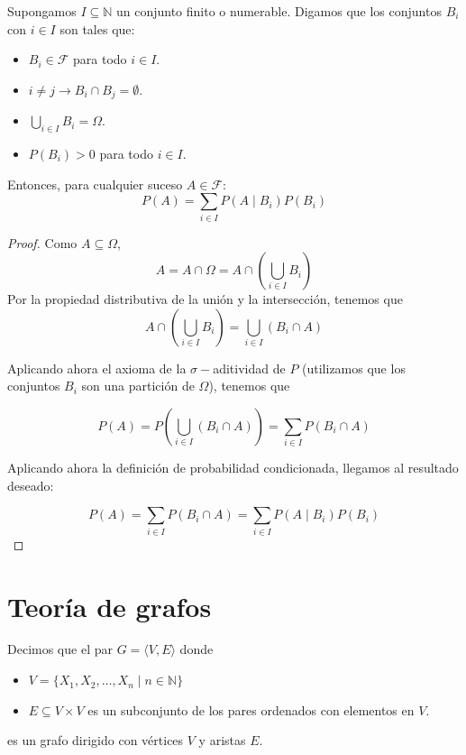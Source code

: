 \begin{teor}
Supongamos $I \subseteq \mathbb{N}$ un conjunto finito o numerable. Digamos que los conjuntos $B_i$ con $i \in I$ son tales que:
\begin{itemize}
    \item $B_i \in \mathcal{F}$ para todo $i \in I$.
    \item $i \neq j \rightarrow B_i \cap B_j = \emptyset$.
    \item $\bigcup_{i \in I} B_i = \Omega$.
    \item $P(B_i) > 0$ para todo $i \in I$.
\end{itemize}
Entonces, para cualquier suceso $A \in \mathcal{F}$:
\begin{equation*}
P(A) = \sum_{i \in I} P(A\mid B_i) P(B_i)
\end{equation*}
\end{teor}
\begin{proof}
Como $A \subseteq \Omega$,
\begin{equation*}
    A = A \cap \Omega = A \cap \left(\bigcup_{i \in I} B_i\right)
\end{equation*}
Por la propiedad distributiva de la unión y la intersección, tenemos que 
\begin{equation*}
A \cap \left(\bigcup_{i \in I} B_i\right) = \bigcup_{i \in I} (B_i \cap A)
\end{equation*}

Aplicando ahora el axioma de la $\sigma-$aditividad de $P$ (utilizamos que los conjuntos $B_i$ son una partición de $\Omega$), tenemos que 

\begin{equation*}
P(A) = P\left(\bigcup_{i \in I} (B_i \cap A)\right) = \sum_{i \in I} P(B_i \cap A)
\end{equation*}

Aplicando ahora la definición de probabilidad condicionada, llegamos al resultado deseado:

\begin{equation*}
P(A) = \sum_{i \in I} P(B_i \cap A) = \sum_{i \in I} P(A \mid B_i)P(B_i)
\end{equation*}

\end{proof}

\section{Teoría de grafos}
\begin{defin}
Decimos que el par $G = \langle V, E\rangle$ donde 
\begin{itemize}
    \item $V = \{X_1, X_2, \ldots, X_n \mid n \in \mathbb{N}\}$
    \item $E \subseteq V \times V$ es un subconjunto de los pares ordenados con elementos en $V$.
\end{itemize}
es un grafo dirigido con vértices $V$ y aristas $E$.
\end{defin}


